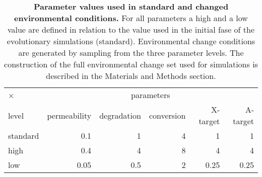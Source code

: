 \begin{table}[htp]
\begin{center}
\begin{tabular}{lrrrrr}
\toprule
× & \multicolumn{5}{c}{parameters} \\
\cmidrule(r){2-6}
level & permeability & degradation & conversion & X-target & A-target\\
\midrule
standard & 0.1 & 1 & 4 & 1 & 1\\
high & 0.4 & 4 & 8 & 4 & 4\\
low & 0.05 & 0.5 & 2 & 0.25 & 0.25\\
\bottomrule
\end{tabular}
\end{center}
\caption{\textbf{Parameter values used in standard and changed environmental conditions.} For all parameters a high and a low value are defined in relation to the value used in the initial fase of the evolutionary simulations (standard). Environmental change conditions are generated by sampling from the three parameter levels. The construction of the full environmental change set used for simulations is described in the Materials and Methods section.}
\label{SI:parameters}
\end{table}

\setcounter{figure}{0}
\renewcommand{\thefigure}{S\arabic{figure}}
\pagebreak
\renewcommand{\figuresection}{Supporting Information Legends}

\label{fig:SIText}

